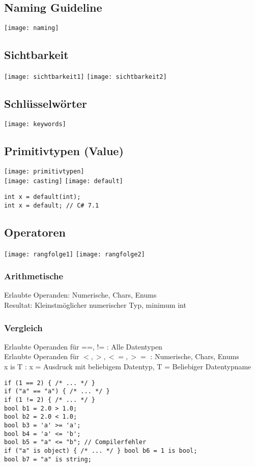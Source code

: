 \begin{multicols*}{2}
\subsection{Naming Guideline}
\texttt{[image: naming]}

\subsection{Sichtbarkeit}
\texttt{[image: sichtbarkeit1]}
\texttt{[image: sichtbarkeit2]}

\subsection{Schlüsselwörter}
\texttt{[image: keywords]}

\subsection{Primitivtypen (Value)}
\texttt{[image: primitivtypen]}\\
\texttt{[image: casting]}
\texttt{[image: default]}
\begin{lstlisting}
int x = default(int);
int x = default; // C# 7.1
\end{lstlisting}

\subsection{Operatoren}
\texttt{[image: rangfolge1]}
\texttt{[image: rangfolge2]}

\subsubsection{Arithmetische}
Erlaubte Operanden: Numerische, Chars, Enums
\\Resultat: Kleinstmöglicher numerischer Typ, minimum int
\subsubsection{Vergleich}
Erlaubte Operanden für ==, != : Alle Datentypen
\\Erlaubte Operanden für $<,>,<=,>=$ : Numerische, Chars, Enums
\\x is T : x = Ausdruck mit beliebigem Datentyp, T = Beliebiger Datentypname
\begin{lstlisting}
if (1 == 2) { /* ... */ }
if ("a" == "a") { /* ... */ }
if (1 != 2) { /* ... */ }
bool b1 = 2.0 > 1.0;
bool b2 = 2.0 < 1.0;
bool b3 = 'a' >= 'a';
bool b4 = 'a' <= 'b';
bool b5 = "a" <= "b"; // Compilerfehler
if ("a" is object) { /* ... */ } bool b6 = 1 is bool;
bool b7 = "a" is string;
\end{lstlisting}

\end{multicols*}
